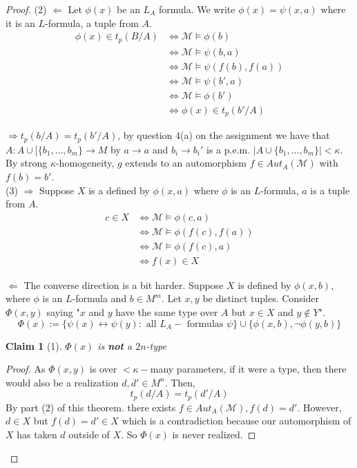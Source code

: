 \documentclass[letterpaper, 12pt]{article}
\newcommand{\cM}{\mathcal{M}}
\theoremstyle{stdthm}
\theoremstyle{stddef}
\theoremstyle{stdnonum}
\newtheorem{claim}{Claim}
\theoremstyle{stdqands}
\theoremstyle{stdbold}
\begin{document}
\begin{proof}
(2) $\Leftarrow$ Let $\phi(x)$ be an $L_A$ formula. We write $\phi(x) = \psi(x,a)$ where it is an $L$-formula, a tuple from $A$. 
\begin{align*}
\phi(x) \in t_p(B/A) & \Leftrightarrow \cM \models \phi(b) \\
& \Leftrightarrow \cM \models \psi(b,a) \\
& \Leftrightarrow \cM \models \psi(f(b), f(a))\\
& \Leftrightarrow \cM \models \psi(b',a)\\
&\Leftrightarrow \cM \models \phi(b') \\
&\Leftrightarrow \phi(x) \in t_p(b'/A) 
\end{align*}

$\Rightarrow t_p(b/A) = t_p(b'/A) $, by question 4(a) on the assignment we have that $A: A \cup[ \{b_1,\dots, b_m\} \to M$ by $a\to a$ and $b_i \to b_i'$ is a p.e.m.  $|A \cup \{b_1,\dots, b_m\}| < \kappa$. By strong $\kappa$-homogeneity, $g$ extends to an automorphism $f \in Aut_A(\cM)$ with $f(b) = b'$. \\

(3) $\Rightarrow$ Suppose $X$ is a defined by $\phi(x,a)$ where $\phi$ is an $L$-formula, $a$ is a tuple from $A$. 
\begin{align*}
c \in X &\Leftrightarrow \cM \models \phi(c,a) \\
& \Leftrightarrow \cM \models \phi(f(c), f(a))\\
& \Leftrightarrow \cM\models \phi(f(c),a)\\
& \Leftrightarrow f(x) \in X 
\end{align*}
 
 $\Leftarrow$ The converse direction is a bit harder. Suppose $X$ is defined by $\phi(x,b)$, where $\phi$ is an $L$-formula and $b \in M^m$. Let $x,y$ be distinct tuples. Consider $\Phi(x,y)$ saying "$x$ and $y$ have the same type over $A$ but $x \in X$ and $y \notin Y$".  
\[ \Phi(x) := \{ \psi(x) \leftrightarrow \psi(y) : \mbox{ all } L_A-\mbox{ formulas } \psi\} \cup \{\phi(x,b), \neg \phi(y,b)\}  \]

\begin{claim}[1]
$\Phi(x)$ is {\bf not} a $2n$-type
\end{claim}

\begin{proof}
As $\Phi(x,y)$ is over $<\kappa-$many parameters, if it were a type, then there would also be a realization $d,d' \in M^n$. Then, 
\[ t_p(d/A) = t_p(d'/A) \]
By part (2) of this theorem. there exists $f \in Aut_A(\cM), f(d) = d'$. However, $d \in X$ but $f(d) = d' \in X$ which is a contradiction because our automorphism of $X$ has taken $d$ outside of $X$. So $\Phi(x)$ is never realized. 
\end{proof}


\end{proof}
\end{document}
